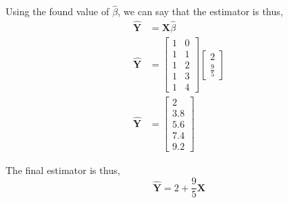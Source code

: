 \documentclass[12pt,letterpaper, onecolumn]{exam}
\begin{document}
\begin{questions}
\begin{solution}
\begin{enumerate}[a.)]
        Using the found value of $\hat{\beta}$, we can say that the estimator is thus,
        \begin{align*}
            \hat{\textbf{Y}} &= \textbf{X}\hat{\beta} \\ 
             \hat{\textbf{Y}}&= \left [\begin{array}{cc}
                1 & 0 \\
                1 & 1 \\
                1 & 2 \\
                1 & 3 \\
                1 & 4
            \end{array} \right]\left [\begin{array}{c}
                2 \\ \frac{9}{5}
            \end{array} \right] \\
             \hat{\textbf{Y}} & = \left[\begin{array}{c}
                2  \\
                3.8  \\
                5.6  \\
                7.4  \\
                9.2 
            \end{array} \right]
        \end{align*}

        The final estimator is thus,
        \begin{equation*}
            \hat{\textbf{Y}} = 2 + \frac{9}{5}\textbf{X}
        \end{equation*}


\end{enumerate}
\end{solution}
\end{questions}
\end{document}
